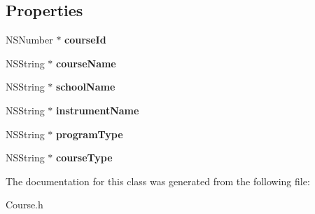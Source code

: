 \subsection*{Properties}
\begin{DoxyCompactItemize}
\item 
\hypertarget{interface_course_ad03513473cc83651e36749f9e5c5be69}{N\+S\+Number $\ast$ {\bfseries course\+Id}}\label{interface_course_ad03513473cc83651e36749f9e5c5be69}

\item 
\hypertarget{interface_course_ace0d7cddc92e6c0d10b1cac95302e1de}{N\+S\+String $\ast$ {\bfseries course\+Name}}\label{interface_course_ace0d7cddc92e6c0d10b1cac95302e1de}

\item 
\hypertarget{interface_course_abb8051bfc97aff735cbb00e75f2fef65}{N\+S\+String $\ast$ {\bfseries school\+Name}}\label{interface_course_abb8051bfc97aff735cbb00e75f2fef65}

\item 
\hypertarget{interface_course_a907b62f431b16309eb1dddb6786f2456}{N\+S\+String $\ast$ {\bfseries instrument\+Name}}\label{interface_course_a907b62f431b16309eb1dddb6786f2456}

\item 
\hypertarget{interface_course_a75b262e8885356165a97a15b69bf1ff1}{N\+S\+String $\ast$ {\bfseries program\+Type}}\label{interface_course_a75b262e8885356165a97a15b69bf1ff1}

\item 
\hypertarget{interface_course_a16df4d28af9a7f6e91a5aa4ce583453d}{N\+S\+String $\ast$ {\bfseries course\+Type}}\label{interface_course_a16df4d28af9a7f6e91a5aa4ce583453d}

\end{DoxyCompactItemize}


The documentation for this class was generated from the following file\+:\begin{DoxyCompactItemize}
\item 
Course.\+h\end{DoxyCompactItemize}
